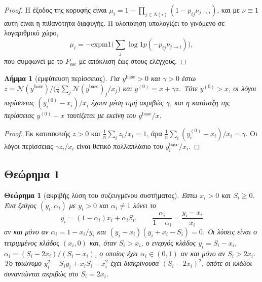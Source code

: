 \documentclass[11pt,a4paper]{article}
\newtheorem{theorem}{Θεώρημα}
\newtheorem{lemma}{Λήμμα}
\theoremstyle{definition}
\theoremstyle{plain}
\newcommand{\Pesc}{P_{\mathrm{esc}}}
\newcommand{\N}{\mathcal{N}}
\begin{document}
\begin{proof}
Η έξοδος της κορυφής είναι $\mu_i=1-\prod_{j\in N(i)}(1-p_{ij}\nu_{j\to i})$, και με $\nu\equiv1$ αυτή είναι η πιθανότητα διαφυγής. Η υλοποίηση υπολογίζει το γινόμενο σε λογαριθμικό χώρο,
\[
\mu_i=-\mathrm{expm1}\Big(\sum_j\log1p(-p_{ij}\nu_{j\to i})\Big),
\]
που συμφωνεί με το $\Pesc$ με απόκλιση έως \KNZzeroDiff{} στους ελέγχους.
\end{proof}

\begin{lemma}[εμφύτευση περίσσειας]\label{lem:embed}
Για $y^{\mathrm{base}}>0$ και $\gamma>0$ έστω $z=\N(y^{\mathrm{base}})/\big(\tfrac1n\sum_j\N(y^{\mathrm{base}})_j/x_j\big)$ και $y^{(0)}=x+\gamma z$. Τότε $y^{(0)}>x$, οι λόγοι περίσσειας $(y^{(0)}_i-x_i)/x_i$ έχουν μέση τιμή ακριβώς $\gamma$, και η κατάταξη της περίσσειας $y^{(0)}-x$ ταυτίζεται με εκείνη του $y^{\mathrm{base}}/x$.
\end{lemma}

\begin{proof}
Εκ κατασκευής $z>0$ και $\frac1n\sum_iz_i/x_i=1$, άρα $\frac1n\sum_i(y^{(0)}_i-x_i)/x_i=\gamma$. Οι λόγοι περίσσειας $\gamma z_i/x_i$ είναι θετικό πολλαπλάσιο του $y^{\mathrm{base}}_i/x_i$.
\end{proof}

\subsection{Θεώρημα 1}

\begin{theorem}[ακριβής λύση του συζευγμένου συστήματος]\label{thm:factor}
Έστω $x_i>0$ και $S_i\ge0$. Ένα ζεύγος $(y_i,\alpha_i)$ με $y_i>0$ και $\alpha_i\ne1$ λύνει το
\[
y_i=(1-\alpha_i)x_i+\alpha_iS_i,\qquad \frac{\alpha_i}{1-\alpha_i}=\frac{y_i-x_i}{x_i}
\]
αν και μόνο αν $\alpha_i=1-x_i/y_i$ και $(y_i-x_i)(y_i+x_i-S_i)=0$. Οι λύσεις είναι ο τετριμμένος κλάδος $(x_i,0)$ και, όταν $S_i>x_i$, ο ενεργός κλάδος $y_i=S_i-x_i$, $\alpha_i=(S_i-2x_i)/(S_i-x_i)$, ο οποίος έχει $\alpha_i\in(0,1)$ αν και μόνο αν $S_i>2x_i$. Το τριώνυμο $y_i^2-S_iy_i+x_iS_i-x_i^2$ έχει διακρίνουσα $(S_i-2x_i)^2$, οπότε οι κλάδοι συναντώνται ακριβώς στο $S_i=2x_i$.
\end{theorem}
\end{document}
